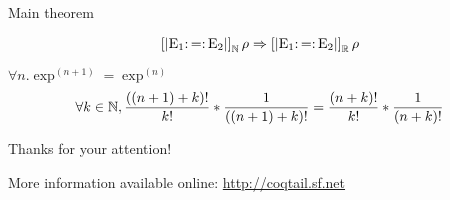 \documentclass{beamer}
\begin{document}
\begin{frame}{Main theorem}

$$\operatorname{\operatorname{\left[\left| E_1 :=: E_2 \right|\right]}_{\mathbb{N}} \rho} \Rightarrow \operatorname{\operatorname{\left[\left| E_1 :=: E_2 \right|\right]}_{\mathbb{R}} \rho}$$

\bigskip

\begin{exampleblock}{$\forall n. \exp^{(n +1)} = \exp^{(n)}$}
$$\forall k \in \mathbb{N}, \frac{((n+1) + k)!}{k!} * \frac{1}{((n+1)+k)!}
= \frac{(n+k)!}{k!} * \frac{1}{(n+k)!}$$
\end{exampleblock}
\end{frame}


\begin{frame}{Thanks for your attention!}

\begin{block}{More information available online:}
\url{http://coqtail.sf.net}
\end{block}

\end{frame}
\end{document}
